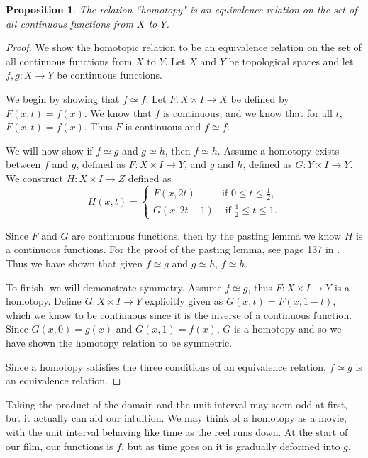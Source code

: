 \documentclass[12pt,oneside]{amsbook}
\newtheorem{prop}[thm]{Proposition}
\begin{document}
\begin{prop}
The relation ``homotopy" is an equivalence relation on the set of all continuous functions from $X$ to $Y$.
\end{prop}

\begin{proof}
We show the homotopic relation to be an equivalence relation on the set of all continuous functions from $X$ to $Y$. Let $X$ and $Y$ be topological spaces and let $f,g\colon X \rightarrow Y$ be continuous functions. 

We begin by showing that $f\simeq f$. Let $F\colon X \times I \rightarrow X$ be defined by $F(x,t)=f(x)$. We know that $f$ is continuous, and we know that for all $t$, $F(x,t)=f(x)$. Thus $F$ is continuous and $f\simeq f$.

We will now show if $f\simeq g$ and $g \simeq h$, then $f \simeq h$. Assume a homotopy exists between $f$ and $g$, defined as $F\colon X\times I \rightarrow Y$, and $g$ and $h$, defined as $G\colon Y\times I \rightarrow Y$. We construct $H\colon X\times I \rightarrow Z$ defined as 
\begin{displaymath}
   H(x,t) = \left\{
     \begin{array}{lr}
       F(x,2t)  &   \text{if } 0\leq t\leq \frac{1}{2},\\
       G(x,2t-1) &  \text{ if } \frac{1}{2}\leq t\leq 1\text{.}
     \end{array}
   \right.
\end{displaymath} 

Since $F$ and $G$ are continuous functions, then by the pasting lemma we know $H$ is a continuous functions. For the proof of the pasting lemma, see page 137 in \cite{factory}. Thus we have shown that given $f\simeq g$ and $g \simeq h$, $f \simeq h$.

To finish, we will demonstrate symmetry. Assume $f\simeq g$, thus $F\colon X \times I \rightarrow Y$ is a homotopy. Define $G\colon X\times I \rightarrow Y$ explicitly given as $G(x,t)=F(x,1-t)$, which we know to be continuous since it is the inverse of a continuous function. Since $G(x,0)=g(x)$ and $G(x,1)=f(x)$, $G$ is a homotopy and so we have shown the homotopy relation to be symmetric.

Since a homotopy satisfies the three conditions of an equivalence relation, $f\simeq g$ is an equivalence relation.
\end{proof}

Taking the product of the domain and the unit interval may seem odd at first, but it actually can aid our intuition. We may think of a homotopy as a movie, with the unit interval behaving like time as the reel runs down. At the start of our film, our functions is $f$, but as time goes on it is gradually deformed into $g$. 
\end{document}
